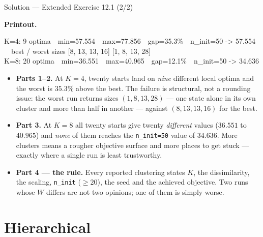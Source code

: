 \documentclass[aspectratio=169,11pt]{beamer}
\begin{document}
\begin{frame}{Solution --- Extended Exercise 12.1 (2/2)}
  \footnotesize
\begin{solutionbox}
  \textbf{Printout.}
  \begin{center}\ttfamily\footnotesize
  K=4: 9 optima\ \ min=57.554\ \ max=77.856\ \ gap=35.3\%\ \ n\_init=50 -> 57.554\\[1pt]
  \ \ best / worst sizes [8, 13, 13, 16] [1, 8, 13, 28]\\[3pt]
  K=8: 20 optima\ \ min=36.551\ \ max=40.965\ \ gap=12.1\%\ \ n\_init=50 -> 34.636
  \end{center}
  \begin{itemize}
    \item \textbf{Parts 1--2.} At $K=4$, twenty starts land on \emph{nine} different local
          optima and the worst is $35.3\%$ above the best. The failure is structural, not a
          rounding issue: the worst run returns sizes $(1,8,13,28)$ --- one state alone in
          its own cluster and more than half in another --- against $(8,13,13,16)$ for the
          best.
    \item \textbf{Part 3.} At $K=8$ all twenty starts give twenty \emph{different} values
          ($36.551$ to $40.965$) and \emph{none} of them reaches the \texttt{n\_init=50}
          value of $34.636$. More clusters means a rougher objective surface and more
          places to get stuck --- exactly where a single run is least trustworthy.
    \item \textbf{Part 4 --- the rule.} Every reported clustering states $K$, the
          dissimilarity, the scaling, \texttt{n\_init} ($\ge 20$), the seed and the
          achieved objective. Two runs whose $W$ differs are not two opinions; one of them
          is simply worse.
  \end{itemize}
\end{solutionbox}
\end{frame}

\section{Hierarchical}
\end{document}
